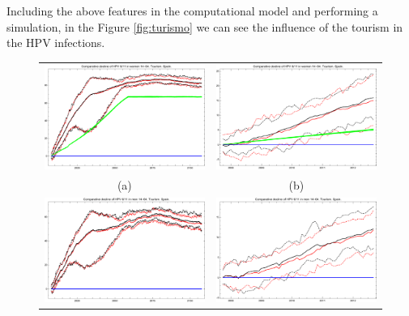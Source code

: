 Including the above features in the computational model and performing a simulation, in the Figure \ref{fig:turismo} we can see the influence of the tourism in the HPV infections.

\begin{figure}[!]
	\centering
	\begin{tabular}{cc}
		\includegraphics[width=0.5\linewidth]{IMGs/6.-Turismo/Decl_muj_14_64_verr_Turismo.pdf}	& 
		\includegraphics[width=0.5\linewidth]{IMGs/6.-Turismo/Decl_muj_14_64_verr_ZOOM_Turismo_ZOOM.pdf}  \\ 
		(a)	& (b) \\ 
		\includegraphics[width=0.5\linewidth]{IMGs/6.-Turismo//Decl_hom_14_64_verr_Turismo.pdf}	& 
		\includegraphics[width=0.5\linewidth]{IMGs/6.-Turismo/Decl_hom_14_64_verr_ZOOM_Turismo_ZOOM.pdf}  \\ 

\end{tabular}
\end{figure}
